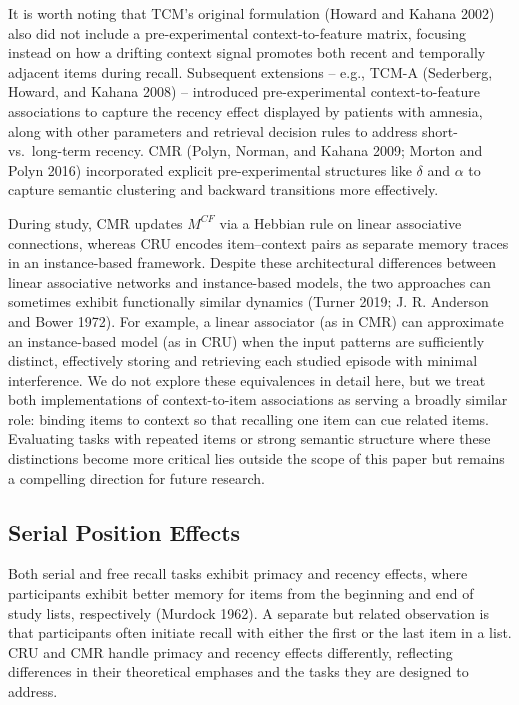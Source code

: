 \documentclass[
  letterpaper,
  DIV=11,
  numbers=noendperiod]{scrartcl}
\begin{document}
It is worth noting that TCM's original formulation (Howard and Kahana
2002) also did not include a pre-experimental context-to-feature matrix,
focusing instead on how a drifting context signal promotes both recent
and temporally adjacent items during recall. Subsequent extensions --
e.g., TCM-A (Sederberg, Howard, and Kahana 2008) -- introduced
pre-experimental context-to-feature associations to capture the recency
effect displayed by patients with amnesia, along with other parameters
and retrieval decision rules to address short- vs.~long-term recency.
CMR (Polyn, Norman, and Kahana 2009; Morton and Polyn 2016) incorporated
explicit pre-experimental structures like \(\delta\) and \(\alpha\) to
capture semantic clustering and backward transitions more effectively.

During study, CMR updates \(M^{CF}\) via a Hebbian rule on linear
associative connections, whereas CRU encodes item--context pairs as
separate memory traces in an instance-based framework. Despite these
architectural differences between linear associative networks and
instance-based models, the two approaches can sometimes exhibit
functionally similar dynamics (Turner 2019; J. R. Anderson and Bower
1972). For example, a linear associator (as in CMR) can approximate an
instance-based model (as in CRU) when the input patterns are
sufficiently distinct, effectively storing and retrieving each studied
episode with minimal interference. We do not explore these equivalences
in detail here, but we treat both implementations of context-to-item
associations as serving a broadly similar role: binding items to context
so that recalling one item can cue related items. Evaluating tasks with
repeated items or strong semantic structure where these distinctions
become more critical lies outside the scope of this paper but remains a
compelling direction for future research.

\subsection{Serial Position Effects}\label{serial-position-effects}

Both serial and free recall tasks exhibit primacy and recency effects,
where participants exhibit better memory for items from the beginning
and end of study lists, respectively (Murdock 1962). A separate but
related observation is that participants often initiate recall with
either the first or the last item in a list. CRU and CMR handle primacy
and recency effects differently, reflecting differences in their
theoretical emphases and the tasks they are designed to address.
\end{document}
